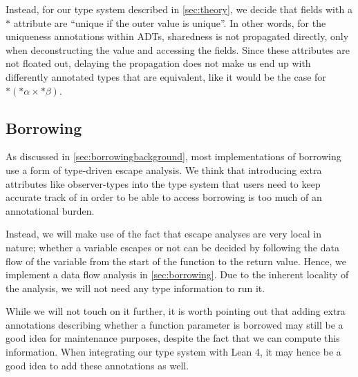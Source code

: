 Instead, for our type system described in \cref{sec:theory}, we decide that fields with a $*$ attribute are ``unique if the outer value is unique''. In other words, for the uniqueness annotations within ADTs, sharedness is not propagated directly, only when deconstructing the value and accessing the fields. Since these attributes are not floated out, delaying the propagation does not make us end up with differently annotated types that are equivalent, like it would be the case for $*(*\alpha \times *\beta)$.

\subsection{Borrowing}
As discussed in \cref{sec:borrowingbackground}, most implementations of borrowing use a form of type-driven escape analysis. We think that introducing extra attributes like observer-types into the type system that users need to keep accurate track of in order to be able to access borrowing is too much of an annotational burden.

Instead, we will make use of the fact that escape analyses are very local in nature; whether a variable escapes or not can be decided by following the data flow of the variable from the start of the function to the return value. Hence, we implement a data flow analysis \cite{allen_program_1976} in \cref{sec:borrowing}. Due to the inherent locality of the analysis, we will not need any type information to run it.

While we will not touch on it further, it is worth pointing out that adding extra annotations describing whether a function parameter is borrowed may still be a good idea for maintenance purposes, despite the fact that we can compute this information. When integrating our type system with Lean 4, it may hence be a good idea to add these annotations as well.